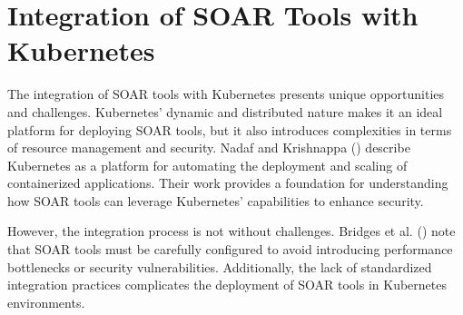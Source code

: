 

\chapter{Integration of SOAR Tools with Kubernetes} \label{cha:integrationOfSoarToolsWithKubernetes}

The integration of SOAR tools with Kubernetes presents unique opportunities and challenges. Kubernetes' dynamic and distributed nature makes it an ideal platform for deploying SOAR tools, but it also introduces complexities in terms of resource management and security. Nadaf and Krishnappa (\citeyear{nadaf_kubernetes_2022}) describe Kubernetes as a platform for automating the deployment and scaling of containerized applications. Their work provides a foundation for understanding how SOAR tools can leverage Kubernetes' capabilities to enhance security.

However, the integration process is not without challenges. Bridges et al. (\citeyear{bridges_testing_2023}) note that SOAR tools must be carefully configured to avoid introducing performance bottlenecks or security vulnerabilities. Additionally, the lack of standardized integration practices complicates the deployment of SOAR tools in Kubernetes environments.
